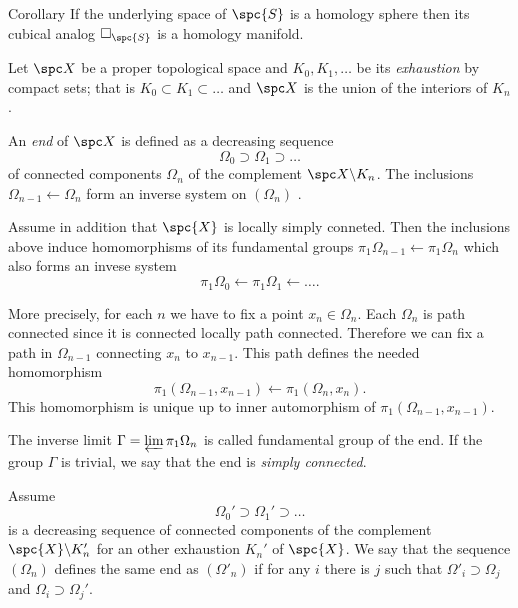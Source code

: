 \begin{thm}{Corollary}\label{cor:flag-hom}
If the underlying space of $\spc{S}$ 
is a homology sphere then its cubical analog $\square_{\spc{S}}$ is a homology manifold.
\end{thm}














Let $\spc X$ be a proper topological space
and $K_0, K_1, \dots$
be its \emph{exhaustion} by compact sets;
that is $K_0\subset K_1\subset \dots$ and $\spc X$ is the union of the interiors of $K_n$.

An \emph{end} of $\spc X$
is defined as a decreasing sequence 
\[\Omega_0\supset \Omega_1\supset \dots\]
of connected components $\Omega_n$ 
of the complement 
$\spc X\backslash K_n$.
The inclusions 
$\Omega_{n-1}\leftarrow \Omega_{n}$
form an inverse system on $(\Omega_n)$ .

Assume in addition that $\spc{X}$
is locally simply conneted.
Then the inclusions above induce 
homomorphisms of its fundamental groups 
$\pi_1\Omega_{n-1}\leftarrow\pi_1\Omega_n$ 
which also forms an invese system
\[\pi_1\Omega_0\leftarrow \pi_1\Omega_1\leftarrow\dots.\]

More precisely, for each $n$ we have to fix a point $x_n\in \Omega_n$.
Each $\Omega_n$ is path connected 
since it is connected locally path connected.
Therefore we can fix a path in $\Omega_{n-1}$
connecting $x_{n}$ to $x_{n-1}$.
This path defines the needed homomorphism 
\[\pi_1(\Omega_{n-1},x_{n-1})\leftarrow\pi_1(\Omega_n,x_n).\]
This homomorphism is unique up to inner automorphism of $\pi_1(\Omega_{n-1},x_{n-1})$.

The inverse limit $\Gamma=\varprojlim \pi_1\Omega_n$ is called fundamental group of the end.
If the group $\Gamma$ is trivial,
we say that the end is \emph{simply connected}.

Assume
\[\Omega_0'\supset \Omega_1'\supset \dots\]
is a decreasing sequence 
of connected components of the complement 
$\spc{X}\backslash K_n'$ for an other exhaustion $K_n'$ of $\spc{X}$.
We say that the sequence $(\Omega_n)$ defines the same end as $(\Omega'_n)$
if for any $i$ there is $j$ such that 
$\Omega'_i\supset \Omega_j$ and $\Omega_i\supset \Omega_j'$.

